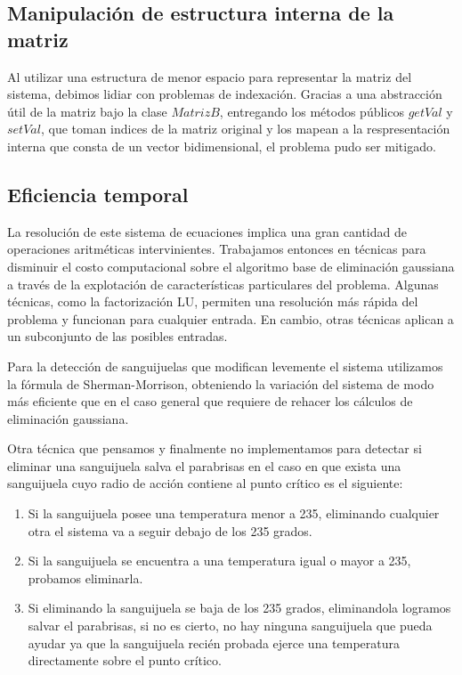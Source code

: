 \VER
\subsection{Manipulaci\'on de estructura interna de la matriz}

Al utilizar una estructura de menor espacio para representar la matriz del sistema, debimos lidiar con problemas de indexación. Gracias a una abstracción útil de la matriz bajo la clase $MatrizB$, entregando los métodos públicos $getVal$ y $setVal$, que toman indices de la matriz original y los mapean a la respresentación interna que consta de un vector bidimensional, el problema pudo ser mitigado.

\subsection{Eficiencia temporal}

La resolución de este sistema de ecuaciones implica una gran cantidad de operaciones aritméticas intervinientes. Trabajamos entonces en técnicas para disminuir el costo computacional sobre el algoritmo base de eliminación gaussiana a través de la explotación de características particulares del problema.
Algunas técnicas, como la factorización LU, permiten una resolución más rápida del problema y funcionan para cualquier entrada. En cambio, otras técnicas aplican a un subconjunto de las posibles entradas.

Para la detección de sanguijuelas que modifican levemente el sistema utilizamos la fórmula de Sherman-Morrison, obteniendo la variación del sistema de modo más eficiente que en el caso general que requiere de rehacer los cálculos de eliminación gaussiana.

Otra técnica que pensamos y finalmente no implementamos para detectar si eliminar una sanguijuela salva el parabrisas en el caso en que exista una sanguijuela cuyo radio de acción contiene al punto crítico es el siguiente:

\begin{enumerate}
 \item Si la sanguijuela posee una temperatura menor a 235, eliminando cualquier otra el sistema va a seguir debajo de los 235 grados.
 \item Si la sanguijuela se encuentra a una temperatura igual o mayor a 235, probamos eliminarla.
 \item Si eliminando la sanguijuela se baja de los 235 grados, eliminandola logramos salvar el parabrisas, si no es cierto, no hay ninguna sanguijuela que pueda ayudar ya que la sanguijuela recién probada ejerce una temperatura directamente sobre el punto crítico.
\end{enumerate}
